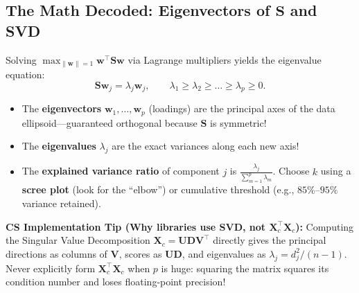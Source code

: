 \documentclass[11pt, a4paper]{article}
\begin{document}
\subsection{The Math Decoded: Eigenvectors of $\mathbf{S}$ and SVD}
Solving $\max_{\|\mathbf{w}\|=1} \mathbf{w}^\top \mathbf{S} \mathbf{w}$ via Lagrange multipliers yields the eigenvalue equation:
\[
    \mathbf{S} \mathbf{w}_j = \lambda_j \mathbf{w}_j, \qquad \lambda_1 \ge \lambda_2 \ge \dots \ge \lambda_p \ge 0.
\]
\begin{itemize}
    \item The \textbf{eigenvectors} $\mathbf{w}_1, \dots, \mathbf{w}_p$ (loadings) are the principal axes of the data ellipsoid---guaranteed orthogonal because $\mathbf{S}$ is symmetric!
    \item The \textbf{eigenvalues} $\lambda_j$ are the exact variances along each new axis!
    \item The \textbf{explained variance ratio} of component $j$ is $\frac{\lambda_j}{\sum_{m=1}^p \lambda_m}$. Choose $k$ using a \textbf{scree plot} (look for the ``elbow'') or cumulative threshold (e.g., $85\%$--$95\%$ variance retained).
\end{itemize}

\textbf{CS Implementation Tip (Why libraries use SVD, not $\mathbf{X}_c^\top\mathbf{X}_c$):} Computing the Singular Value Decomposition $\mathbf{X}_c = \mathbf{U}\mathbf{D}\mathbf{V}^\top$ directly gives the principal directions as columns of $\mathbf{V}$, scores as $\mathbf{U}\mathbf{D}$, and eigenvalues as $\lambda_j = d_j^2 / (n-1)$. Never explicitly form $\mathbf{X}_c^\top \mathbf{X}_c$ when $p$ is huge: squaring the matrix squares its condition number and loses floating-point precision!
\end{document}

